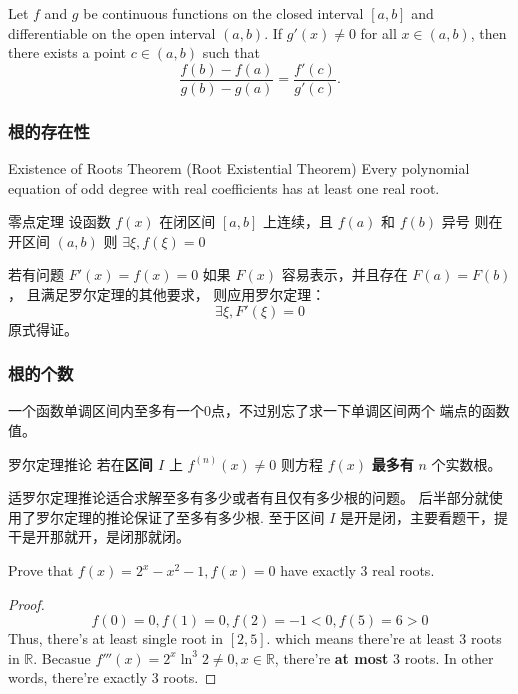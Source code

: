 \begin{theorem} \label{cauthy-mean-value}
    Let $f$ and $g$ be continuous functions on the closed interval $[a, b]$ and differentiable on the open interval $(a, b)$. If $g'(x) \neq 0$ for all $x \in (a, b)$, then there exists a point $c \in (a, b)$ such that
    \[
        \frac{f(b) - f(a)}{g(b) - g(a)} = \frac{f'(c)}{g'(c)}.
    \]
\end{theorem}

\subsubsection{根的存在性}

\begin{definition} {Existence of Roots Theorem (Root Existential Theorem)} 
    Every polynomial equation of odd degree with real coefficients has at least one real root.
\end{definition}
\begin{definition}{零点定理}
    设函数 $f(x)$ 在闭区间 $\left[a, b\right]$ 上连续，且 $f(a)$ 和 $f(b)$ 异号
    则在开区间 $\left(a, b\right)$ 则 $\exists \xi, f(\xi) = 0$
\end{definition}

若有问题 $F'(x) = f(x) = 0$ 如果 $F(x)$ 容易表示，并且存在 $F(a)=F(b)$，
且满足罗尔定理的其他要求，
则应用罗尔定理：
\[
    \exists \xi, F'(\xi) = 0
\]
原式得证。

\subsubsection{根的个数} \label{number-of-roots-question}

一个函数单调区间内至多有一个0点，不过别忘了求一下单调区间两个
端点的函数值。

\begin{lemma}{罗尔定理推论}
    若在\textbf{区间 $I$} 上 $f^{(n)}(x) \neq 0$ 
    则方程 $f(x)$ \textbf{最多有} $n$ 个实数根。
\end{lemma}
适罗尔定理推论适合求解至多有多少或者有且仅有多少根的问题。
后半部分就使用了罗尔定理的推论保证了至多有多少根.
至于区间 $I$ 是开是闭，主要看题干，提干是开那就开，是闭那就闭。

\begin{example}{\cite[page 77, pdf 88，例4]{we}}
    \label{ex:special-val-substitution}
    Prove that $f(x) = 2^x - x^2 - 1, f(x) = 0$ have exactly 3 real roots.
    \begin{proof}
        \[
            f(0) = 0, f(1) = 0, f(2) = -1 < 0, f(5) = 6 > 0
        \]
        Thus, there's at least single root in $[2, 5]$. 
        which means there're at least 3 roots in $\mathbb{R}$.
        Becasue $f'''(x) = 2^x \ln ^3 2 \neq 0, x \in \mathbb{R}$, there're \textbf{at most}
        3 roots.
        In other words, there're exactly 3 roots.
    \end{proof}
\end{example}

